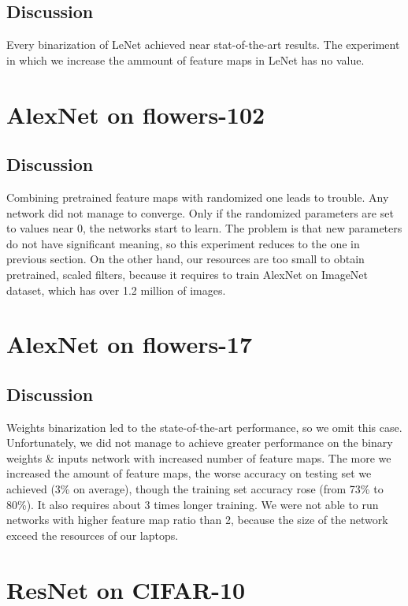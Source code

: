 \documentclass[licencjacka]{pracamgr}
\begin{document}
	\subsection{Discussion}
	Every binarization of LeNet achieved near stat-of-the-art results. The experiment in which we increase the ammount of feature maps in LeNet has no value.
	\section{AlexNet on flowers-102}
	\subsection{Discussion}
	Combining pretrained feature maps with randomized one leads to trouble. Any network did not manage to converge. Only if the randomized parameters are set to values near 0, the networks start to learn. The problem is that new parameters do not have significant meaning, so this experiment reduces to the one in previous section. On the other hand, our resources are too small to obtain pretrained, scaled filters, because it requires to train AlexNet on ImageNet dataset, which has over 1.2 million of images.
	\section{AlexNet on flowers-17}
	\subsection{Discussion}
	Weights binarization led to the state-of-the-art performance, so we omit this case. Unfortunately, we did not manage to achieve greater performance on the binary weights \& inputs network with increased number of feature maps. The more we increased the amount of feature maps, the worse accuracy on testing set we achieved (3\% on average), though the training set accuracy rose (from 73\% to 80\%). It also requires about 3 times longer training.  We were not able to run networks with higher feature map ratio than 2, because the size of the network exceed the resources of our laptops.
	\section{ResNet on CIFAR-10}
\end{document}
